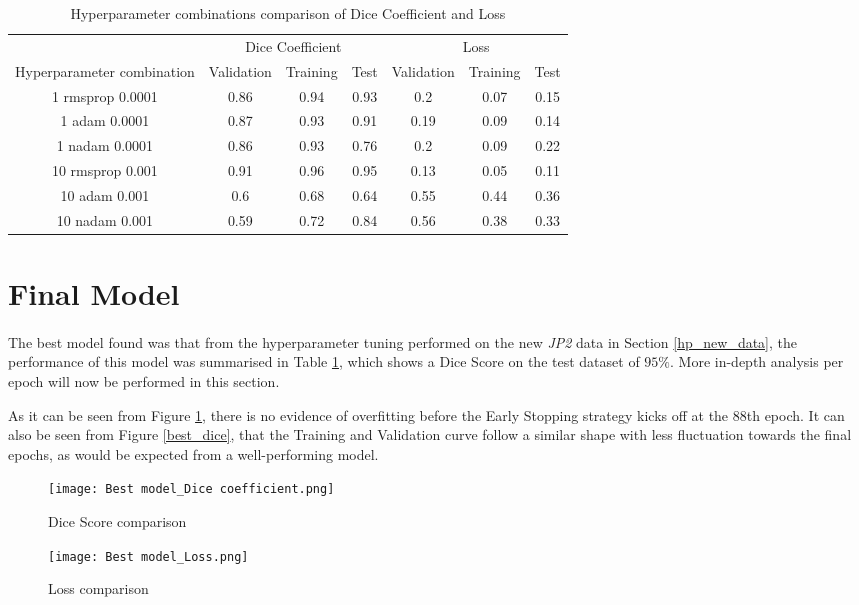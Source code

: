 \begin{table}[ht!] 
    \begin{center}
    \begin{tabular}{ccccccc} 
    \toprule
       & \multicolumn{3}{c}{Dice Coefficient}     & \multicolumn{3}{c}{Loss} \\
    Hyperparameter combination & Validation & Training & Test & Validation & Training & Test \\ \midrule
    1 rmsprop 0.0001 & 0.86 & 0.94 & 0.93 & 0.2 & 0.07 & 0.15  \\ 1 adam 0.0001 & 0.87 & 0.93 & 0.91 & 0.19 & 0.09 & 0.14  \\ 1 nadam 0.0001 & 0.86 & 0.93 & 0.76 & 0.2 & 0.09 & 0.22  \\ \rowcolor{lightgray}10 rmsprop 0.001 & 0.91 & 0.96 & 0.95 & 0.13 & 0.05 & 0.11  \\ 10 adam 0.001 & 0.6 & 0.68 & 0.64 & 0.55 & 0.44 & 0.36  \\ 10 nadam 0.001 & 0.59 & 0.72 & 0.84 & 0.56 & 0.38 & 0.33  \\
\bottomrule
    \end{tabular}
  \end{center} 
  \caption{Hyperparameter combinations comparison of Dice Coefficient and Loss}\label{tab_hp}
\end{table}

\section{Final Model}
\paragraph{}
The best model found was that from the hyperparameter tuning performed on the new \textit{JP2} data in Section \ref{hp_new_data}, the performance of this model was summarised in Table \ref{tab_hp}, which shows a Dice Score on the test dataset of $95\%$. More in-depth analysis per epoch will now be performed in this section.

As it can be seen from Figure \ref{best_loss}, there is no evidence of overfitting before the Early Stopping strategy kicks off at the 88th epoch. It can also be seen from Figure \ref{best_dice}, that the Training and Validation curve follow a similar shape with less fluctuation towards the final epochs, as would be expected from a well-performing model.

\begin{figure}[hbt!]
    \begin{minipage}[c]{0.5\linewidth}
    \texttt{[image: Best model\_Dice coefficient.png]}
    \caption{Dice Score comparison}
    \label{best_dice}
    \end{minipage}
        \hfill
        \begin{minipage}[c]{0.5\linewidth}
        \texttt{[image: Best model\_Loss.png]}
        \caption{Loss
        comparison}
        \label{best_loss}
    \end{minipage}
\end{figure}

